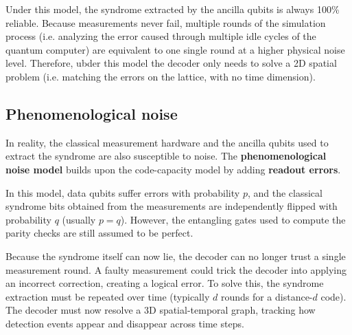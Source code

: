 Under this model, the syndrome extracted by the ancilla qubits is always 100\% reliable. Because measurements never fail, multiple rounds of the simulation process (i.e. analyzing the error caused through multiple idle cycles of the quantum computer) are equivalent to one single round at a higher physical noise level. Therefore, ubder this model the decoder only needs to solve a 2D spatial problem (i.e. matching the errors on the lattice, with no time dimension). 

\subsection{Phenomenological noise}
In reality, the classical measurement hardware and the ancilla qubits used to extract the syndrome are also susceptible to noise. The \textbf{phenomenological noise model} builds upon the code-capacity model by adding \textbf{readout errors}. 

In this model, data qubits suffer errors with probability $p$, and the classical syndrome bits obtained from the measurements are independently flipped with probability $q$ (usually $p=q$). However, the entangling gates used to compute the parity checks are still assumed to be perfect.

Because the syndrome itself can now lie, the decoder can no longer trust a single measurement round. A faulty measurement could trick the decoder into applying an incorrect correction, creating a logical error. To solve this, the syndrome extraction must be repeated over time (typically $d$ rounds for a distance-$d$ code). The decoder must now resolve a 3D spatial-temporal graph, tracking how detection events appear and disappear across time steps.

